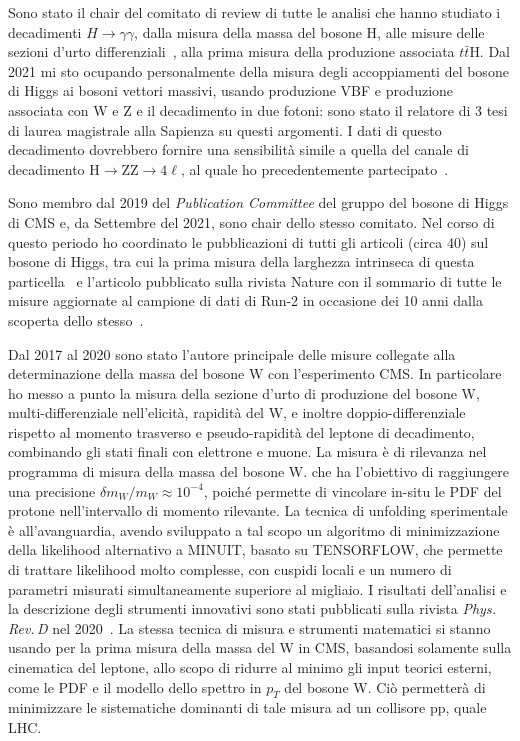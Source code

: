 \documentclass[a4paper,12pt,twoside]{article}
\begin{document}
{  Sono stato il chair del comitato di review di tutte le analisi che
  hanno studiato i decadimenti $H\to\gamma\gamma$, dalla misura della
  massa del bosone H, alle misure delle sezioni d'urto
  differenziali~, alla prima misura della produzione
  associata $t\bar{t}$H.  Dal 2021 mi sto ocupando personalmente della
  misura degli accoppiamenti del bosone di Higgs ai bosoni vettori
  massivi, usando produzione VBF e produzione associata con W e
  Z e il decadimento in due fotoni: sono stato il relatore di 3 tesi
  di laurea magistrale alla Sapienza su questi argomenti. I dati di
  questo decadimento dovrebbero fornire una sensibilit\`a simile a
  quella del canale di decadimento H$\to$ZZ$\to 4\ell$, al quale ho
  precedentemente partecipato~.
  
  Sono membro dal 2019 del {\it Publication Committee} del gruppo del
  bosone di Higgs di CMS e, da Settembre del 2021, sono chair dello
  stesso comitato. Nel corso di questo periodo ho coordinato le
  pubblicazioni di tutti gli articoli (circa 40) sul bosone di Higgs,
  tra cui la prima misura della larghezza intrinseca di questa
  particella~ e l'articolo pubblicato sulla rivista
  Nature con il sommario di tutte le misure aggiornate al campione di
  dati di Run-2 in occasione dei 10 anni dalla scoperta dello
  stesso~.

  Dal 2017 al 2020 sono stato l'autore principale delle misure
  collegate alla determinazione della massa del bosone W con
  l'esperimento CMS. In particolare ho messo a punto la misura della
  sezione d'urto di produzione del bosone W, multi-differenziale
  nell'elicit\`a, rapidit\`a del W, e inoltre doppio-differenziale
  rispetto al momento trasverso e pseudo-rapidit\`a del leptone di
  decadimento, combinando gli stati finali con elettrone e muone. La
  misura \`e di rilevanza nel programma di misura della massa del
  bosone W. che ha l'obiettivo di raggiungere una precisione $\delta
  m_W/m_W\approx 10^{-4}$, poich\'e permette di vincolare in-situ le
  PDF del protone nell'intervallo di momento rilevante. La tecnica di
  unfolding sperimentale \`e all'avanguardia, avendo sviluppato a tal
  scopo un algoritmo di minimizzazione della likelihood alternativo a
  \textsc{MINUIT}, basato su \textsc{TENSORFLOW}, che permette di
  trattare likelihood molto complesse, con cuspidi locali e un numero
  di parametri misurati simultaneamente superiore al migliaio. I
  risultati dell'analisi e la descrizione degli strumenti innovativi
  sono stati pubblicati sulla rivista \textit{Phys.\,Rev.\,D} nel
  2020~. La stessa tecnica di misura e strumenti
  matematici si stanno usando per la prima misura della massa del W in
  CMS, basandosi solamente sulla cinematica del leptone, allo scopo di
  ridurre al minimo gli input teorici esterni, come le PDF e il
  modello dello spettro in $p_T$ del bosone W.  Ci\`o permetter\`a di
  minimizzare le sistematiche dominanti di tale misura ad un collisore
  pp, quale LHC.

}
\end{document}
